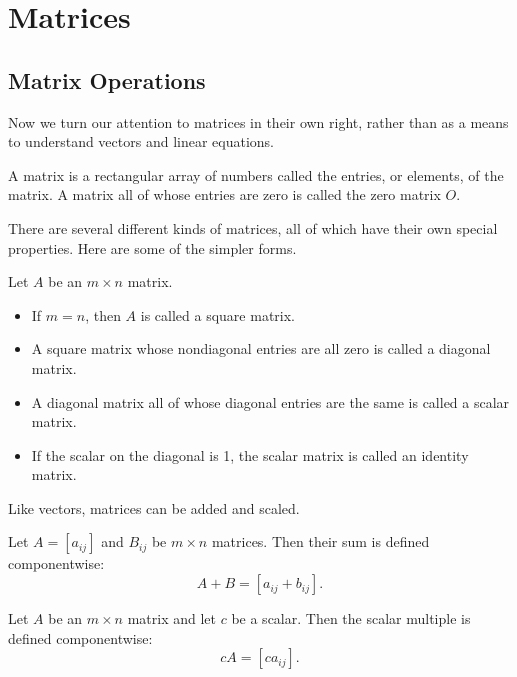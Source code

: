 \documentclass[../m73main.tex]{subfiles}
\begin{document}
\chapter{Matrices}

\section{Matrix Operations}
Now we turn our attention to matrices in their own right, rather than as a means to understand vectors and linear equations.

\begin{definition}[Matrix]
	A matrix is a rectangular array of numbers called the entries, or elements, of the matrix.
	A matrix all of whose entries are zero is called the zero matrix $O$.
\end{definition}

There are several different kinds of matrices, all of which have their own special properties.
Here are some of the simpler forms.

\begin{definition}
	Let $A$ be an $m \times n$ matrix.
	\begin{itemize}
		\item If $ m =n$, then $A$ is called a square matrix.
		\item A square matrix whose nondiagonal entries are all zero is called a diagonal matrix.
		\item A diagonal matrix all of whose diagonal entries are the same is called a scalar matrix.
		\item If the scalar on the diagonal is 1, the scalar matrix is called an identity matrix.
	\end{itemize}
\end{definition}

Like vectors, matrices can be added and scaled.

\begin{definition}
	Let $A = [a_{ij}]$ and $B_{ij}$ be $m \times n$ matrices.
	Then their sum is defined componentwise:
	\[ A + B = [a_{ij} + b_{ij}]. \]
\end{definition}

\begin{definition}
	Let $A$ be an $m\times n$ matrix and let $c$ be a scalar.
	Then the scalar multiple is defined componentwise:
	\[ cA = [ca_{ij}]. \]
\end{definition}
\end{document}
